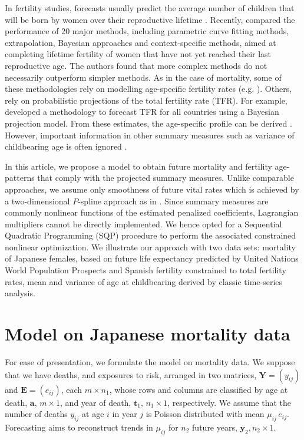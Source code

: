 \documentclass[a4paper,twoside, openright, 12pt, leqno]{article}
\begin{document}
In fertility studies, forecasts usually predict the average number of children that will be born by women over their reproductive lifetime \citep{bohk2018forecast}. Recently, \citet{bohk2018forecast} compared the performance of 20 major methods, including parametric curve fitting methods, extrapolation, Bayesian approaches and context-specific methods, aimed at completing lifetime fertility of women that have not yet reached their last reproductive age. The authors found that more complex methods do not necessarily outperform simpler methods. As in the case of mortality, some of these methodologies rely on modelling age-specific fertility rates (e.g. \citet{coale1974model,chandola1999recent,schmertmann2003system,peristera2007modeling,hyndman2008stochastic}). Others, rely on probabilistic projections of the total fertility rate (TFR). For example, \citet{alkema2011probabilistic} developed a methodology to forecast TFR for all countries using a Bayesian projection model. From these estimates, the age-specific profile can be derived \citep{vsevvcikova2016age}. However, important information in other summary measures such as variance of childbearing age is often ignored \citep{hruschka2016does}.

In this article, we propose a model to obtain future mortality and fertility age-patterns that comply with the projected summary measures. Unlike comparable approaches, we assume only smoothness of future vital rates which is achieved by a two-dimensional $P$-spline approach as in \citet{currie2004smoothing}. Since summary measures are commonly nonlinear functions of the estimated penalized coefficients, Lagrangian multipliers cannot be directly implemented. We hence opted for a Sequential Quadratic Programming (SQP) procedure \citep{nocedal2006sequential} to perform the associated constrained nonlinear optimization. We illustrate our approach with two data sets: mortality of Japanese females, based on future life expectancy predicted by United Nations World Population Prospects \citep{UN2017} and Spanish fertility constrained to total fertility rates, mean and variance of age at childbearing derived by classic time-series analysis.


\section{Model on Japanese mortality data}

For ease of presentation, we formulate the model on mortality data. We suppose that we have deaths, and exposures to risk, arranged in two matrices, 
$\bm{Y} = (y_{ij})$ and $\bm{E} = (e_{ij})$, each $m \times n_{1}$, whose rows and columns are classified by age at death, $\bm{a}, \,m \times 1$, and year of death, $\bm{t}_{1}, \,n_{1} \times 1$, respectively.  
We assume that the number of deaths $y_{ij}$ at age $i$ in year $j$ is Poisson distributed with mean $\mu_{ij} \,e_{ij}$. %
Forecasting aims to reconstruct trends in $\mu_{ij}$ for $n_{2}$ future years, $\bm{y}_{2}, n_{2} \times 1$.
\end{document}
